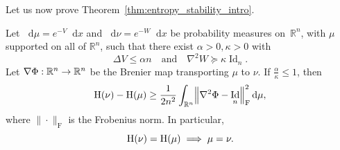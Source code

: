 \documentclass[AHL,Unicode,longabstracts]{cedram}
\newcommand{\R}{\mathbb R}
\DeclareMathOperator{\Id}{Id}
\newcommand{\Ent}{\mathrm H}
\newcommand{\V}{V}
\newcommand{\W}{W}
\newcommand{\dd}{n}
\newcommand{\source}{\mu}
\newcommand{\target}{\nu}
\newcommand{\lsh}{\alpha}
\newcommand{\lc}{\kappa}
\newcommand*\diff{\mathop{}\!\mathrm{d}}
\newcommand{\OT}{\Phi}
\renewcommand*{\to}{\mathchoice{\longrightarrow}{\rightarrow}{\rightarrow}{\rightarrow}}
\renewcommand*{\implies}{\mathchoice{\Longrightarrow}{\Rightarrow}{\Rightarrow}{\Rightarrow}}
\let\originalleft\left
\let\originalright\right
\renewcommand{\left}{\mathopen{}\mathclose\bgroup\originalleft}
\renewcommand{\right}{\aftergroup\egroup\originalright}
\begin{document}
Let us now prove Theorem~\ref{thm:entropy_stability_intro}.
\begin{theo}\label{thm:stab}
Let $\diff\source=e^{-\V}\diff x$ and $\diff\target=e^{-\W}\diff x$ be probability measures on~$\R^{\dd}$, with $\source$ supported on all of $\R^{\dd}$, such that there exist $\lsh>0,\lc>0$ with
\[
\Delta \V \le \lsh\dd \quad\text{and}\quad \nabla^2\W \succeq \lc \Id_{\dd}.
\]
Let $\nabla\OT:\R^{\dd}\to\R^{\dd}$ be the Brenier map transporting $\source$ to $\target$. If $\frac{\lsh}{\lc}\le 1$, then
\begin{equation}\label{eq:stab_proof}
\Ent(\target)- \Ent(\source) \ge \frac{1}{2\dd^2}\int_{\R^{\dd}}\left\|\nabla^2\OT-\Id_{\dd}\right\|_{\text{F}}^2\diff \source,
\end{equation}
where $\|\cdot\|_{\text{F}}$ is the Frobenius norm. In particular,
\begin{equation}\label{eq:entropy_eq_proof}
\Ent(\target)= \Ent(\source)\;\implies \; \source=\target.
\end{equation}
\end{theo}
\end{document}
